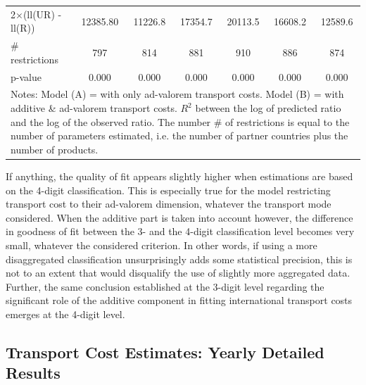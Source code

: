 \documentclass[11pt,twoside, authoryear]{elsarticle}
\begin{document}
\begin{table}[htbp]
\begin{center}
{\begin{tabular}{l|cccccc}
2$\times$(ll(UR) -ll(R)) & 12385.80 & 11226.8 & \multicolumn{1}{c}{17354.7} & \multicolumn{1}{c}{20113.5} & \multicolumn{1}{c}{16608.2} & \multicolumn{1}{c}{12589.6} \\
\# restrictions  & 797   & 814   & \multicolumn{1}{c}{881} & \multicolumn{1}{c}{910} & \multicolumn{1}{c}{886} & \multicolumn{1}{c}{874} \\
p-value & 0.000 & 0.000 & \multicolumn{1}{c}{0.000} & \multicolumn{1}{c}{0.000} & \multicolumn{1}{c}{0.000} & \multicolumn{1}{c}{0.000} \\
\hline\hline
\multicolumn{7}{l}{\parbox[l]{13cm}{ \vspace{7pt}\scriptsize{Notes: Model (A) = with only ad-valorem transport costs.
Model (B) = with additive \& ad-valorem
transport costs.
$R^{2}$ between the log of predicted ratio and the log of the observed ratio.
The number \# of restrictions is equal to the number of parameters estimated, i.e. the number of partner countries plus the number of products.}}}
\end{tabular}%
}
\end{center}
\end{table}%


If anything, the quality of fit appears slightly higher when estimations are based on the 4-digit classification. This is especially true for the model restricting transport cost to their ad-valorem dimension, whatever the transport mode considered.
When the additive part is taken into account however, the difference in goodness of fit between the 3- and the 4-digit classification level becomes very small, whatever the considered criterion.
In other words, if using a more disaggregated classification unsurprisingly adds some statistical precision, this is not to an extent that would disqualify the use of slightly more aggregated data.
Further, the same conclusion established at the 3-digit level regarding the significant role of the additive component in fitting international transport costs emerges at the 4-digit level.

\newpage

\newpage
\setcounter{table}{0}
\renewcommand{\thetable}{B.\arabic{table}}

\subsection{Transport Cost Estimates: Yearly Detailed Results}
\end{document}
